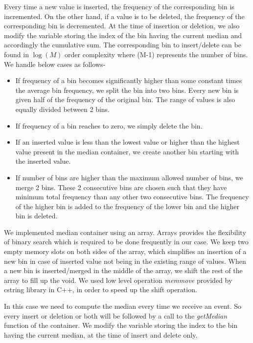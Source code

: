 Every time a new value is inserted, the frequency of the corresponding bin is incremented. On the other hand, if a value is to be deleted, the frequency of the corresponding bin is decremented. At the time of insertion or deletion, we also modify the variable storing the index of the bin having the current median and accordingly the cumulative sum. The corresponding bin to insert/delete can be found in $\log(M)$ order complexity where (M-1) represents the number of bins. We handle below cases as follows-
\begin{itemize}
\item If frequency of a bin becomes significantly higher than some constant times the average bin frequency, we split the bin into two bins. Every new bin is given half of the frequency of the original bin. The range of values is also equally divided between 2 bins.
\item If frequency of a bin reaches to zero, we simply delete the bin.
\item If an inserted value is less than the lowest value or higher than the highest value present in the median container, we create another bin starting with the inserted value.
\item If number of bins are higher than the maximum allowed number of bins, we merge 2 bins. These 2 consecutive bins are chosen such that they have minimum total frequency than any other two consecutive bins. The frequency of the higher bin is added to the frequency of the lower bin and the higher bin is deleted.
\end{itemize}

We implemented median container using an array. Arrays provides the flexibility of binary search which is required to be done frequently in our case. We keep two empty memory slots on both sides of the array, which simplifies an insertion of a new bin in case of inserted value not being in the existing range of values. When a new bin is inserted/merged in the middle of the array, we shift the rest of the array to fill up the void.  We used low level operation \textit{memmove} provided by cstring library in C++, in order to speed up the shift operation.

In this case we need to compute the median every time we receive an event. So every insert or deletion or both will be followed by a call to the \textit{getMedian} function of the container.  We modify the variable storing the index to the bin having the current median, at the time of insert and delete only.

